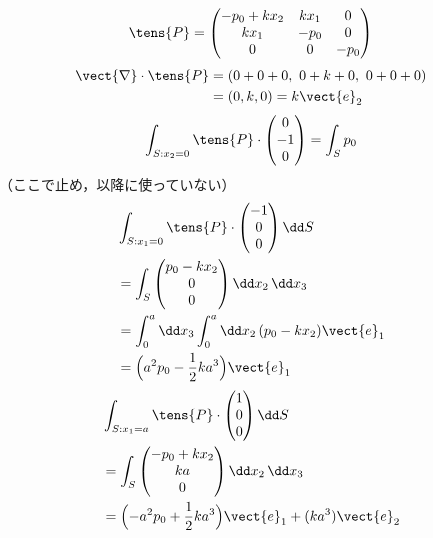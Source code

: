 \[ \tens{P}=\begin{pmatrix}-p_{0}+kx_{2}&kx_{1}&0\\kx_{1}&-p_{0}&0\\0&0&-p_{0}\end{pmatrix} \]
\begin{align*}
\vect{\nabla}\cdot\tens{P}&=(0+0+0,\ 0+k+0,\ 0+0+0)\\
&=(0,k,0)=k\vect{e}_{2}
\end{align*}
\[ \int_{S:x_{2}=0}\tens{P}\cdot\begin{pmatrix}0\\-1\\0\end{pmatrix}=\int_{S}p_{0} \]
（ここで止め，以降に使っていない）
\begin{align*}
&\int_{S:x_{1}=0}\tens{P}\cdot\begin{pmatrix}-1\\0\\0\end{pmatrix}\dd S\\
&=\int_{S}\begin{pmatrix}p_{0}-kx_{2}\\0\\0\end{pmatrix}\dd x_{2}\,\dd x_{3}\\
&=\int_{0}^{a}\dd x_{3}\int_{0}^{a}\dd x_{2}\,(p_{0}-kx_{2})\vect{e}_{1}\\
&=\Bigl(a^{2}p_{0}-\frac{1}{2}ka^{3}\Bigr)\vect{e}_{1}
\end{align*}
\begin{align*}
&\int_{S:x_{1}=a}\tens{P}\cdot\begin{pmatrix}1\\0\\0\end{pmatrix}\dd S\\
&=\int_{S}\begin{pmatrix}-p_{0}+kx_{2}\\ka\\0\end{pmatrix}\dd x_{2}\,\dd x_{3}\\
&=\Bigl(-a^{2}p_{0}+\frac{1}{2}ka^{3}\Bigr)\vect{e}_{1}+(ka^{3})\vect{e}_{2}
\end{align*}
